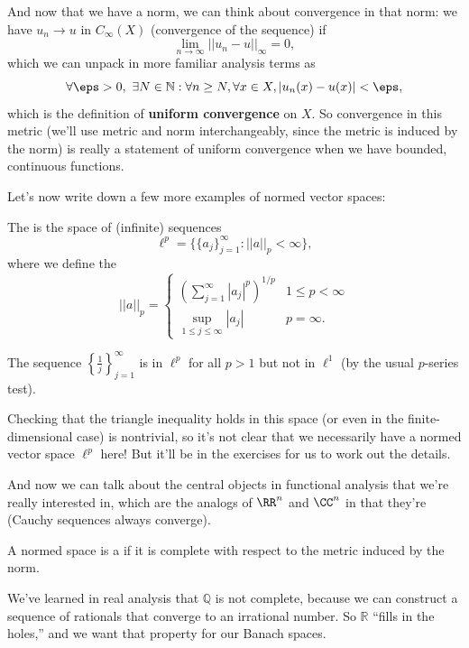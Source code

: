 And now that we have a norm, we can think about convergence in that norm: we have $u_n \to u$ in $C_{\infty}(X)$ (convergence of the sequence) if
\[
    \lim_{n \to \infty} ||u_n-u||_{\infty} = 0,
\]
which we can unpack in more familiar analysis terms as 
\[
    \forall \eps > 0, \, \, \exists N \in \mathbb{N}: \forall n \ge N, \forall x \in X, |u_n(x) - u(x)| < \eps,
\]
which is the definition of \textbf{uniform convergence} on $X$. So convergence in this metric (we'll use metric and norm interchangeably, since the metric is induced by the norm) is really a statement of uniform convergence when we have bounded, continuous functions.

Let's now write down a few more examples of normed vector spaces:

\begin{definition}
The  is the space of (infinite) sequences
\[
    \ell^p = \{\{a_j\}_{j=1}^{\infty}: ||a||_p < \infty\},
\]  
where we define the 
\[
    ||a||_p = \begin{cases} \left(\sum_{j=1}^{\infty} |a_j|^p\right)^{1/p} & 1 \le p < \infty \\ \sup_{1 \le j \le \infty} |a_j| & p = \infty. \end{cases}
\]
\end{definition}

\begin{example}
The sequence $\left\{\frac{1}{j}\right\}_{j=1}^{\infty}$ is in $\ell^p$ for all $p > 1$ but not in $\ell^1$ (by the usual $p$-series test).
\end{example}

Checking that the triangle inequality holds in this space (or even in the finite-dimensional case) is nontrivial, so it's not clear that we necessarily have a normed vector space $\ell^p$ here! But it'll be in the exercises for us to work out the details.

And now we can talk about the central objects in functional analysis that we're really interested in, which are the analogs of $\RR^n$ and $\CC^n$ in that they're  (Cauchy sequences always converge). 

\begin{definition}
A normed space is a  if it is complete with respect to the metric induced by the norm.
\end{definition}

We've learned in real analysis that $\mathbb{Q}$ is not complete, because we can construct a sequence of rationals that converge to an irrational number. So $\mathbb{R}$ ``fills in the holes,'' and we want that property for our Banach spaces.

